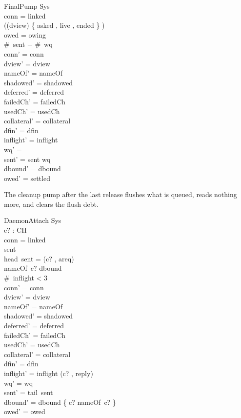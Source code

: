 \documentclass[a4paper,10pt,fleqn]{article}
\begin{document}
\begin{schema}{FinalPump}
  \Delta Sys \\
\where
  conn = linked \\
  \lnot ((\ran dview) \cap \{ asked , live , ended \} \neq \emptyset) \\
  owed = owing \\
  \#~sent + \#~wq  \\
  conn' = conn \\
  dview' = dview \\
  nameOf' = nameOf \\
  shadowed' = shadowed \\
  deferred' = deferred \\
  failedCh' = failedCh \\
  usedCh' = usedCh \\
  collateral' = collateral \\
  dfin' = dfin \\
  inflight' = inflight \\
  wq' = \langle \rangle \\
  sent' = sent \cat wq \\
  dbound' = dbound \\
  owed' = settled
\end{schema}

The cleanup pump after the last release flushes what is queued, reads nothing more, and clears the flush debt.

\begin{schema}{DaemonAttach}
  \Delta Sys \\
  c? : CH \\
\where
  conn = linked \\
  sent \neq \langle \rangle \\
  head~sent = (c? , areq) \\
  nameOf~c? \notin \ran dbound \\
  \#~inflight < 3 \\
  conn' = conn \\
  dview' = dview \\
  nameOf' = nameOf \\
  shadowed' = shadowed \\
  deferred' = deferred \\
  failedCh' = failedCh \\
  usedCh' = usedCh \\
  collateral' = collateral \\
  dfin' = dfin \\
  inflight' = inflight \cat \langle (c? , reply) \rangle \\
  wq' = wq \\
  sent' = tail~sent \\
  dbound' = dbound \cup \{ c? \mapsto nameOf~c? \} \\
  owed' = owed
\end{schema}
\end{document}
